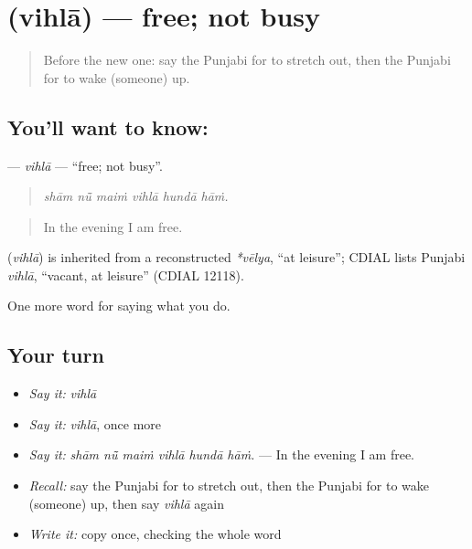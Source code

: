 \section[\texorpdfstring{\pa{ਵਿਹਲਾ} (vihlā)}{ਵਿਹਲਾ (vihlā)}]{ (vihlā) — free; not busy}

\label{lesson:PA-C225-vihla}



\begin{quote}
Before the new one: say the Punjabi for to stretch out, then the Punjabi for to wake (someone) up.
\end{quote}

\subsection*{You'll want to know: }
\textbf{} — \emph{vihlā} — \textquotedblleft{}free; not busy\textquotedblright{}.

\begin{quote}
     
\end{quote}

\begin{quote}
\emph{shām nū̃ maiṁ vihlā hundā hāṁ.}
\end{quote}

\begin{quote}
In the evening I am free.
\end{quote}

\begin{cousinweb}
\textbf{} (\emph{vihlā}) is inherited from a reconstructed \emph{*vēlya}, \textquotedblleft{}at leisure\textquotedblright{}; CDIAL lists Punjabi \emph{vihlā}, \textquotedblleft{}vacant, at leisure\textquotedblright{} (CDIAL 12118).
\end{cousinweb}

\begin{grammarlens}[title={What you've built}]
One more word for saying what you do.
\end{grammarlens}

\subsection*{Your turn}
\begin{itemize}
\raggedright
  \item \emph{Say it:} \emph{vihlā}
  \item \emph{Say it:} \emph{vihlā}, once more
  \item \emph{Say it:} \emph{shām nū̃ maiṁ vihlā hundā hāṁ.} — In the evening I am free.
  \item \emph{Recall:} say the Punjabi for to stretch out, then the Punjabi for to wake (someone) up, then say \emph{vihlā} again
  \item \emph{Write it:} copy \textbf{} once, checking the whole word
\end{itemize}

